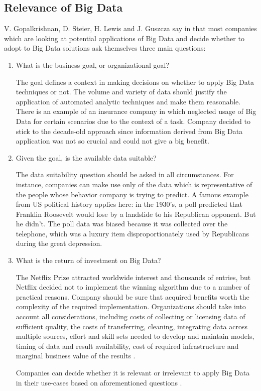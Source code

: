 \documentclass[runningheads]{llncs}
\begin{document}
\subsection{Relevance of Big Data}
V. Gopalkrishnan, D. Steier, H. Lewis and J. Guszcza say in \cite{Gopalkrishnan} that most companies which are looking at potential applications of Big Data and decide whether to adopt to Big Data solutions ask themselves three main questions:
\begin{enumerate}
\item What is the business goal, or organizational goal? 

The goal defines a context in making decisions on whether to apply Big Data techniques or not. The volume and variety of data should justify the application of automated analytic techniques and make them reasonable. There is an example of an insurance company in \cite{Gopalkrishnan} which neglected usage of Big Data for certain scenarios due to the context of a task. Company decided to stick to the decade-old approach since information derived from Big Data application was not so crucial and could not give a big benefit. 
\item Given the goal, is the available data suitable? 

The data suitability question should be asked in all circumstances. For instance, companies can make use only of the data which is representative of the people whose behavior company is trying to predict. A famous example from US political history applies here: in the 1930's, a poll predicted that Franklin Roosevelt would lose by a landslide to his Republican opponent. But he didn't. The poll data was biased because it was collected over the telephone, which was a luxury item disproportionately used by Republicans during the great depression.
\item What is the return of investment on Big Data? 

The Netflix Prize attracted worldwide interest and thousands of entries, but Netflix decided not to implement the winning algorithm \cite{NETFLIX} due to a number of practical reasons. Company should be sure that acquired benefits worth the complexity of the required implementation. Organizations should take into account all considerations, including costs of collecting or licensing data of sufficient quality, the costs of transferring, cleaning, integrating data across multiple sources, effort and skill sets needed to develop and maintain models, timing of data and result availability, cost of required infrastructure and marginal business value of the results \cite{Gopalkrishnan}.

Companies can decide whether it is relevant or irrelevant to apply Big Data in their use-cases based on aforementioned questions .
\end{enumerate}
\end{document}
